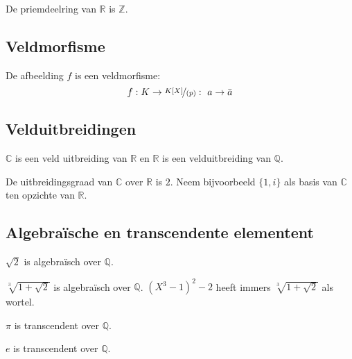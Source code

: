 \documentclass[main.tex]{subfiles}
\begin{document}
\begin{vb}
  De priemdeelring van $\mathbb{R}$ is $\mathbb{Z}$.
\end{vb}

\subsection{Veldmorfisme}
\label{sec:veldmorfisme}
\begin{vb}
  De afbeelding $f$ is een veldmorfisme:
  \[ f: K \rightarrow \nicefrac{K[X]}{(p)}:\ a \rightarrow \bar{a} \]
\end{vb}

\subsection{Velduitbreidingen}
\label{sec:velduitbreidingen}

\begin{vb}
  $\mathbb{C}$ is een veld uitbreiding van $\mathbb{R}$ en $\mathbb{R}$ is een velduitbreiding van $\mathbb{Q}$.
\end{vb}

\begin{vb}
  De uitbreidingsgraad van $\mathbb{C}$ over $\mathbb{R}$ is $2$.
  Neem bijvoorbeeld $\{ 1,i \}$ als basis van $\mathbb{C}$ ten opzichte van $\mathbb{R}$.
\end{vb}

\subsection{Algebra\"ische en transcendente elementent}
\label{sec:algebr-en-transc}

\begin{vb}
  $\sqrt{2}$ is algebra\"isch over $\mathbb{Q}$.
\end{vb}

\begin{vb}
  $\sqrt[3]{1+\sqrt{2}}$ is algebra\"isch over $\mathbb{Q}$. $(X^{3}-1)^{2}-2$ heeft immers $\sqrt[3]{1+\sqrt{2}}$ als wortel.
\end{vb}

\begin{vb}
  $\pi$ is transcendent over $\mathbb{Q}$. \zb
\end{vb}

\begin{vb}
  $e$ is transcendent over $\mathbb{Q}$. \zb
\end{vb}
\end{document}

